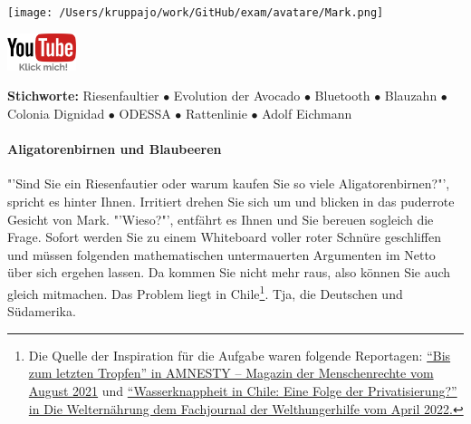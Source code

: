\documentclass[a4paper, 9pt]{scrartcl}\usepackage[]{graphicx}\usepackage[]{xcolor}
\begin{document}
 
\ifcollection
\begin{flushright}
\tiny\vspace{-3Ex}
\textbf{\examinhaltstart}
\exammodulemathstat
\vspace{-4Ex}
\end{flushright}
\begin{minipage}[t]{0.5\textwidth}
\texttt{[image: /Users/kruppajo/work/GitHub/exam/avatare/Mark.png]}
\end{minipage}
\begin{minipage}[t]{0.5\textwidth}
\hfill
\href{https://youtu.be/https://youtu.be/k2G52hMIfqk}{\includegraphics[width = 2cm]{img/youtube}}
\end{minipage}
\fi

{\tiny\textbf{Stichworte:} Riesenfaultier $\bullet$ Evolution der Avocado $\bullet$ Bluetooth $ \bullet$ Blauzahn $\bullet$ Colonia Dignidad $\bullet$ ODESSA $\bullet$ Rattenlinie $\bullet$ Adolf Eichmann}



\ifcollection
\paragraph{Aligatorenbirnen und Blaubeeren}
\fi



"'Sind Sie ein Riesenfautier oder warum kaufen Sie so viele Aligatorenbirnen?"', spricht es hinter Ihnen. Irritiert drehen Sie sich um und blicken in das puderrote Gesicht von Mark. "'Wieso?"', entfährt es Ihnen und Sie bereuen sogleich die Frage. Sofort werden Sie zu einem Whiteboard voller roter Schnüre geschliffen und müssen folgenden mathematischen untermauerten Argumenten im Netto über sich ergehen lassen. Da kommen Sie nicht mehr raus, also können Sie auch gleich mitmachen. Das Problem liegt in Chile\footnote{Die Quelle der Inspiration für die Aufgabe waren folgende Reportagen: \href{https://www.amnesty.ch/de/ueber-amnesty/publikationen/magazin-amnesty/2021-3/bis-zum-letzten-tropfen}{"`Bis zum letzten Tropfen"' in AMNESTY – Magazin der Menschenrechte vom August 2021} und \href{https://www.welthungerhilfe.de/welternaehrung/rubriken/klima-ressourcen/wassernot-in-chile-eine-folge-der-privatisierung}{"`Wasserknappheit in Chile: Eine Folge der Privatisierung?"' in Die Welternährung dem Fachjournal der Welthungerhilfe vom April 2022.}}. Tja, die Deutschen und Südamerika.\\
\end{document}
